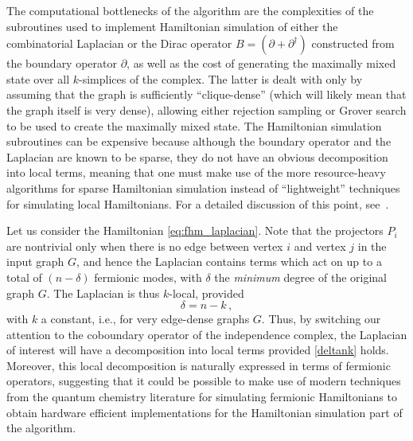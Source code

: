 \documentclass[11pt]{article}
\numberwithin{equation}{section}
\newcommand\equ[1] {\begin{equation}#1\end{equation}}
\renewcommand\( {\left(}
\renewcommand\) {\right)}
\begin{document}
The computational bottlenecks of the algorithm are the complexities of the subroutines used to implement Hamiltonian simulation of either the combinatorial Laplacian or the Dirac operator $B = (\partial + \partial^\dagger)$ constructed from the boundary operator $\partial$, as well as the cost of generating the maximally mixed state over all $k$-simplices of the complex. The latter is dealt with only by assuming that the graph is sufficiently ``clique-dense'' (which will likely mean that the graph itself is very dense), allowing either rejection sampling or Grover search to be used to create the maximally mixed state.
The Hamiltonian simulation subroutines can be expensive because although the boundary operator and the Laplacian are known to be sparse, they do not have an obvious decomposition into local terms, meaning that one must make use of the more resource-heavy algorithms for sparse Hamiltonian simulation instead of ``lightweight'' techniques for simulating local Hamiltonians. For a detailed discussion of this point, see~\cite{gyurik}.

Let us consider the Hamiltonian \eqref{eq:fhm_laplacian}.  Note that the projectors $P_i$  are nontrivial only when there is no edge between vertex $i$ and vertex $j$ in the input graph $G$, and hence the Laplacian contains terms which act on up to a total of $(n-\delta)$ fermionic modes, with $\delta$ the {\it minimum} degree of the original graph $G$. The Laplacian is thus $k$-local, provided
\equ{\label{deltank}
\delta= n-k\,,
}
with $k$ a constant, i.e., for very edge-dense graphs $G$. Thus, by switching our attention to the coboundary operator of the independence complex, the Laplacian of interest will have a decomposition into local terms provided \eqref{deltank} holds. Moreover, this local decomposition is naturally expressed in terms of fermionic operators, suggesting that it could be possible to make use of modern techniques from the quantum chemistry literature for simulating fermionic Hamiltonians to obtain hardware efficient implementations for the Hamiltonian simulation part of the algorithm. 
\end{document}
